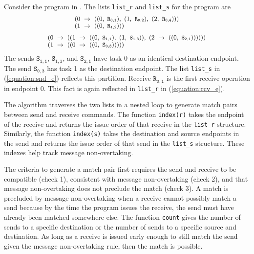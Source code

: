 Consider the program in . The lists \texttt{list\_r} and \texttt{list\_s} for the program are
\begin{equation}
\footnotesize \begin{array}{l}
(0\ \rightarrow\ ((0,\ \mathtt{R_{0,1}}),\ (1,\ \mathtt{R_{0,2}}),\ (2,\ \mathtt{R_{0,4}})))\\
(1\ \rightarrow\ ((0,\ \mathtt{R_{1,2}})))\\
\end{array}
\label{equation:rcv_e}
\end{equation}
\begin{equation}
\footnotesize \begin{array}{l}
(0\ \rightarrow\ ((1\ \rightarrow\ ((0,\ \mathtt{S_{1,1}}),\ (1,\ \mathtt{S_{1,3}})),\ (2\ \rightarrow\ ((0,\ \mathtt{S_{2,1}}))))))\\
(1\ \rightarrow\ ((0\ \rightarrow\ ((0,\ \mathtt{S_{0,3}})))))\\
\end{array}
\label{equation:snd_e}
\end{equation}
The sends $\mathtt{S_{1,1}}$, $\mathtt{S_{1,3}}$, and
$\mathtt{S_{2,1}}$ have task 0 as an identical destination
endpoint. The send $\mathtt{S_{0,3}}$ has task 1 as the destination
endpoint. The list \texttt{list\_s} in (\ref{equation:snd_e}) reflects
this partition.  Receive $\mathtt{R_{0,1}}$ is the first receive
operation in endpoint 0. This fact is again reflected
in \texttt{list\_r} in (\ref{equation:rcv_e}).

The algorithm traverses the two lists in a nested loop to generate
match pairs between send and receive commands. The
function \texttt{index(r)} takes the endpoint of the receive and
returns the issue order of that receive in the \texttt{list\_r}
structure. Similarly, the function \texttt{index(s)} takes the
destination and source endpoints in the send and returns the issue
order of that send in the \texttt{list\_s} structure. These indexes
help track message non-overtaking.

The criteria to generate a match pair first requires the send and
receive to be compatible (check 1), consistent with message
non-overtaking (check 2), and that message non-overtaking does not preclude the
match (check 3). A match is precluded by message non-overtaking when a
receive cannot possibly match a send because by the time the program
issues the receive, the send must have already been matched somewhere
else. The function \texttt{count} gives the number of sends to a
specific destination or the number of sends to a specific source and
destination.  As long as a receive is issued early enough to still
match the send given the message non-overtaking rule, then the match
is possible.


